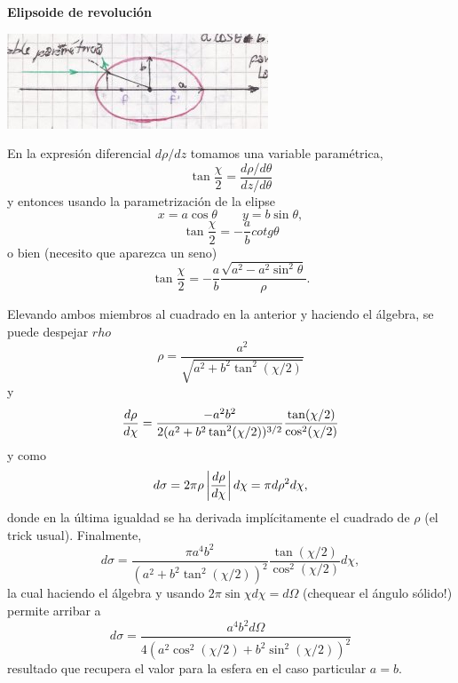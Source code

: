 \documentclass[10pt,oneside]{CBFT_book}
\begin{document}
\begin{ejemplo}{\bf Elipsoide de revolución}

\includegraphics[scale=0.5]{images/fig_mc_dispersion_elipsoide.jpg}  

En la expresión diferencial $d\rho/dz$ tomamos una variable paramétrica,
\[
	\tan \frac{\chi}{2} = \frac{d\rho/d\theta}{dz/d\theta}
\]
y entonces usando la parametrización de la elipse 
\[
	x = a \cos \theta \qquad y = b \sin \theta,
\]
\[
	\tan \frac{\chi}{2} = - \frac{a}{b} cotg \theta
\]
o bien (necesito que aparezca un seno)
\[
	\tan \frac{\chi}{2} = - \frac{a}{b} \frac{\sqrt{a^2 - a^2 \sin^2 \theta}}{\rho}.
\]

Elevando ambos miembros al cuadrado en la anterior y haciendo el álgebra, se puede despejar
$rho$
\[
	\rho = \frac{ a^2 }{\sqrt{ a^2 + b^2 \tan^2 (\chi/2) }}
\]
y
\[
	\frac{d^{\hspace{-0.05em}} {\rho}}{d {\chi}^{\hspace{-0.05em}}} = \frac{ - a^2 b^2 }{2 ( a^2 + b^2 \tan^2 (\chi/2) )^{3/2} }
	\frac{\tan(\chi/2)}{\cos^2(\chi/2)}
\]
y como 
\[
	d\sigma = 2\pi \rho \left|\frac{d^{\hspace{-0.05em}} {\rho}}{d {\chi}^{\hspace{-0.05em}}}\right| d\chi = \pi d \rho^2 d\chi, 
\]
donde en la última igualdad se ha derivada implícitamente el cuadrado de $\rho$ (el trick usual).
Finalmente,
\[
	d\sigma = \frac{ \pi a^4 b^2 }{( a^2 + b^2 \tan^2 (\chi/2) )^{2} }
	\frac{\tan(\chi/2)}{\cos^2(\chi/2)} d\chi,
\]
la cual haciendo el álgebra y usando $2 \pi \sin \chi d\chi = d\Omega$ (chequear el ángulo sólido!) 
permite arribar a 
\[
	d\sigma = \frac{ a^4 b^2 d\Omega }{ 4 ( a^2 \cos^2 (\chi/2) + b^2 \sin^2 (\chi/2) )^2 }
\]
resultado que recupera el valor para la esfera en el caso particular $a=b$.
 
\end{ejemplo}
\end{document}
